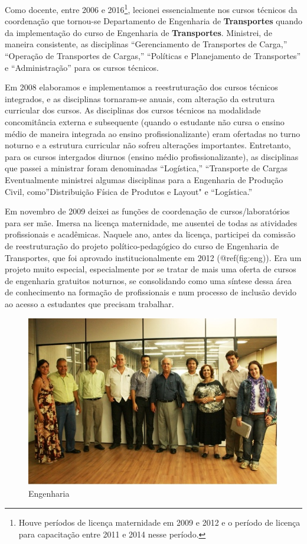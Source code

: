 \documentclass[
]{book}
\begin{document}
Como docente, entre 2006 e 2016\footnote{Houve períodos de licença
  maternidade em 2009 e 2012 e o período de licença para capacitação
  entre 2011 e 2014 nesse período.}, lecionei essencialmente nos cursos
técnicos da coordenação que tornou-se Departamento de Engenharia de
\textbf{Transportes} quando da implementação do curso de Engenharia de
\textbf{Transportes}. Ministrei, de maneira consistente, as disciplinas
``Gerenciamento de Transportes de Carga,'' ``Operação de Transportes de
Cargas,'' ``Políticas e Planejamento de Transportes'' e
``Administração'' para os cursos técnicos.

Em 2008 elaboramos e implementamos a reestruturação dos cursos técnicos
integrados, e as disciplinas tornaram-se anuais, com alteração da
estrutura curricular dos cursos. As disciplinas dos cursos técnicos na
modalidade concomitância externa e subsequente (quando o estudante não
cursa o ensino médio de maneira integrada ao ensino profissionalizante)
eram ofertadas no turno noturno e a estrutura curricular não sofreu
alterações importantes. Entretanto, para os cursos intergados diurnos
(ensino médio profissionalizante), as disciplinas que passei a ministrar
foram denominadas ``Logística,'' ``Transporte de Cargas Eventualmente
ministrei algumas disciplinas para a Engenharia de Produção Civil,
como''Distribuição Física de Produtos e Layout" e ``Logística.''

Em novembro de 2009 deixei as funções de coordenação de
cursos/laboratórios para ser mãe. Imersa na licença maternidade, me
ausentei de todas as atividades profissionais e acadêmicas. Naquele ano,
antes da licença, participei da comissão de reestruturação do projeto
político-pedagógico do curso de Engenharia de Transportes, que foi
aprovado institucionalmente em 2012 (@ref(fig:eng)). Era um projeto
muito especial, especialmente por se tratar de mais uma oferta de cursos
de engenharia gratuitos noturnos, se consolidando como uma síntese dessa
área de conhecimento na formação de profissionais e num processo de
inclusão devido ao acesso a estudantes que precisam trabalhar.

\begin{figure}
\includegraphics[width=1.3\linewidth]{img/Imagem1} \caption{Engenharia}\label{fig:eng}
\end{figure}
\end{document}
